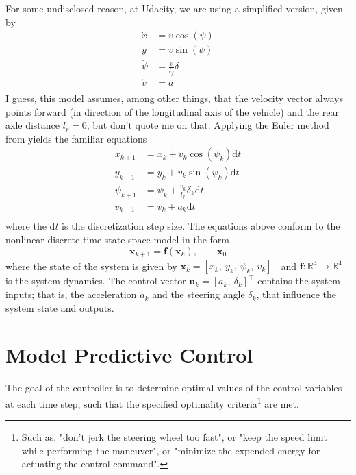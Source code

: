 \documentclass[a4paper]{article}
\begin{document}
For some undisclosed reason, at Udacity, we are using a simplified version, given by
\begin{subequations}
\begin{align}\label{eq:kinematic_bicycle_model_continuous_udacity}
\dot{x} 	&=  v \cos(\psi) \\
\dot{y} 	&=  v \sin(\psi) \\
\dot{\psi} 	&=  \frac{v}{l_f} \delta \\
\dot{v} 	&=  a \\
\end{align}
\end{subequations}
I guess, this model assumes, among other things, that the velocity vector always points forward (in direction of the longitudinal axis of the vehicle) and the rear axle distance \( l_r = 0 \), but don't quote me on that.
Applying the Euler method from  yields the familiar equations
\begin{subequations}
\begin{align}\label{eq:kinematic_bicycle_model_discrete_udacity}
x_{k+1} 	&= x_k + v_k\cos(\psi_k) \mathrm{d}t \\
y_{k+1} 	&= y_k + v_k\sin(\psi_k) \mathrm{d}t \\
\psi_{k+1} 	&= \psi_k + \frac{v_k}{l_f}\delta_k \mathrm{d}t \\
v_{k+1} 	&= v_k + a_k\mathrm{d}t \\
\end{align}
\end{subequations}
where the \( \mathrm{d}t \) is the discretization step size.
The equations above conform to the nonlinear discrete-time state-space model in the form
\begin{equation}\label{eq:mpc_general_ssm}
	\bm{x}_{k+1} = \bm{f}(\bm{x}_k),\qquad \bm{x}_0
\end{equation}
where the state of the system is given by \( \bm{x}_k = \left[x_k,\ y_k,\ \psi_k,\ v_k \right]^\top \) and \( \bm{f}: \mathbb{R}^4\to\mathbb{R}^4 \) is the system dynamics.
The control vector \( \bm{u}_k = \left[a_k,\ \delta_k\right]^\top \) contains the system inputs; that is, the acceleration \( a_k \) and the steering angle \( \delta_k \), that influence the system state and outputs.




\section{Model Predictive Control}\label{sec:model_predictive_control}
The goal of the controller is to determine optimal values of the control variables at each time step, such that the specified optimality criteria\footnote{Such as, "don't jerk the steering wheel too fast", or "keep the speed limit while performing the maneuver", or "minimize the expended energy for actuating the control command".} are met.
\end{document}
